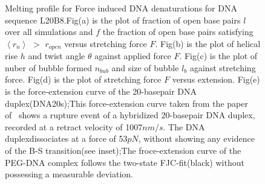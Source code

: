 \documentclass[12pt,masters,final]{UTRGVthesis}
\begin{document}
\begin{figure}[!h]
\caption{\small Melting profile for Force induced DNA denaturations for DNA sequence L20B8.Fig(a) is the plot of fraction of open base pairs $l$ over all simulations and $f$ the fraction of open base pairs satisfying $\left<r_n\right>$ $>$ $r_{open}$ versus stretching force $F$. Fig(b) is the plot of helical rise $h$ and twist angle $\theta$ against applied force $F$. Fig(c) is the plot of nuber of bubble formed  $n_{bub}$ and size of bubble $l_b$ against stretching force. Fig(d) is the plot of stretching force $F$ versus extension. Fig(e) is the force-extension curve of the 20-basepair DNA duplex(DNA20s);This force-extension curve taken from the paper of~\protect\cite{Morfill:2007} shows a rupture event of a hybridized 20-basepair DNA duplex, recorded at a retract velocity of 1007$nm/s$. The DNA duplexdissociates at a force of 53$pN$, without showing any evidence of the B-S transition(see inset);The froce-extension curve of the  PEG-DNA complex follows the two-state FJC-fit(black) without possessing a measurable deviation.}
\label{fig:L20b8}    

\end{figure}
%
\newpage
\end{document}
